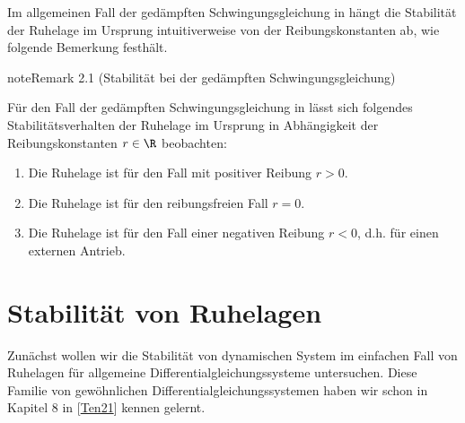 \documentclass[letterpaper,10pt,english]{jupyterBook}
\begin{document}
\sphinxAtStartPar
Im allgemeinen Fall der gedämpften Schwingungsgleichung in {\hyperref[\detokenize{ode/fluesse:ex:oscillations}]{}} hängt die Stabilität der Ruhelage im Ursprung intuitiverweise von der Reibungskonstanten ab, wie folgende Bemerkung festhält.
\label{ode_stability/stabilitaetsbegriffe:remark-2}
\begin{sphinxadmonition}{note}{Remark 2.1 (Stabilität bei der gedämpften Schwingungsgleichung)}



\sphinxAtStartPar
Für den Fall der gedämpften Schwingungsgleichung in {\hyperref[\detokenize{ode/fluesse:equation-eq-schwingungsgleichung}]{}} lässt sich folgendes Stabilitätsverhalten der Ruhelage im Ursprung in Abhängigkeit der Reibungskonstanten \(r \in \R\) beobachten:
\begin{enumerate}
%
\item {} 
\sphinxAtStartPar
Die Ruhelage ist  für den Fall mit positiver Reibung \(r>0\).

\item {} 
\sphinxAtStartPar
Die Ruhelage ist  für den reibungsfreien Fall \(r=0\).

\item {} 
\sphinxAtStartPar
Die Ruhelage ist  für den Fall einer negativen Reibung \(r < 0\), d.h. für einen externen Antrieb.

\end{enumerate}
\end{sphinxadmonition}


\section{Stabilität von Ruhelagen}
\label{\detokenize{ode_stability/ruhelagen:stabilitat-von-ruhelagen}}\label{\detokenize{ode_stability/ruhelagen::doc}}
\sphinxAtStartPar
Zunächst wollen wir die Stabilität von dynamischen System im einfachen Fall von Ruhelagen für allgemeine  Differentialgleichungssysteme untersuchen.
Diese Familie von gewöhnlichen Differentialgleichungssystemen haben wir schon in Kapitel 8 in {[}\hyperlink{cite.references:id12}{Ten21}{]} kennen gelernt.
\end{document}

